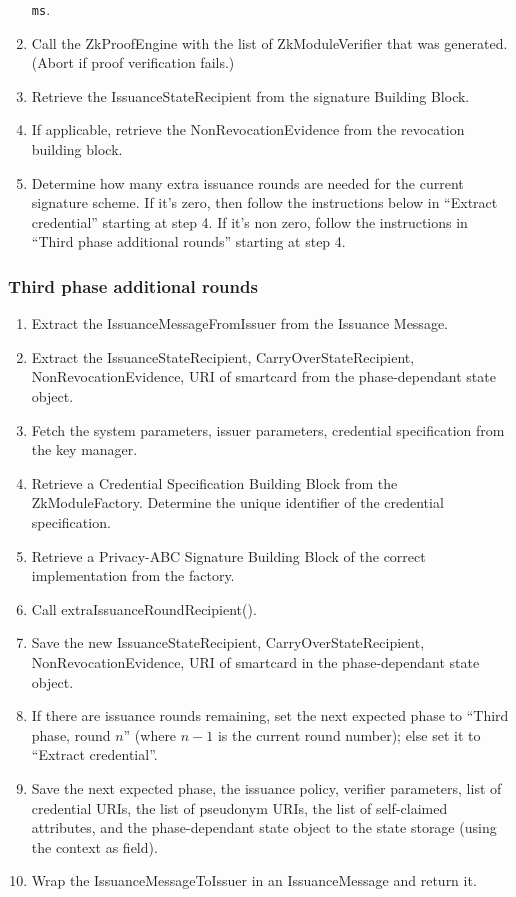 \begin{enumerate}
  \texttt{ms}.
  \item Call the ZkProofEngine with the list of ZkModuleVerifier that was generated. (Abort if proof verification fails.)
  \item Retrieve the IssuanceStateRecipient from the signature Building Block.
  \item If applicable, retrieve the NonRevocationEvidence from the revocation building block.
  \item Determine how many extra issuance rounds are needed for the current signature scheme. If it's zero, then follow the
    instructions below in ``Extract credential'' starting at step 4. If it's non zero, follow the instructions in ``Third phase additional rounds'' starting at step 4.
  \end{enumerate}

  \subsubsection{Third phase additional rounds}
  \begin{enumerate}
    \item Extract the IssuanceMessageFromIssuer from the Issuance Message.
    \item Extract the IssuanceStateRecipient, CarryOverStateRecipient, NonRevocationEvidence, URI of smartcard from the phase-dependant state object.
    \item Fetch the system parameters, issuer parameters, credential specification from the key manager.
    \item Retrieve a Credential Specification Building Block from the ZkModuleFactory. Determine the unique identifier
      of the credential specification.
    \item Retrieve a Privacy-ABC Signature Building Block of the correct implementation from the factory.
    \item Call extraIssuanceRoundRecipient().
    \item Save the new IssuanceStateRecipient, CarryOverStateRecipient, NonRevocationEvidence, URI of smartcard in the phase-dependant state object.
    \item If there are issuance rounds remaining, set the next expected phase to ``Third phase, round $n$'' (where $n-1$ is the
       current round number); else set it to ``Extract credential''.
    \item Save the next expected phase, the issuance policy, verifier parameters, list of credential URIs, the list of
      pseudonym URIs, the list of self-claimed attributes, and the phase-dependant state object to the state storage (using the context as field).
    \item Wrap the IssuanceMessageToIssuer in an IssuanceMessage and return it.
  \end{enumerate}

